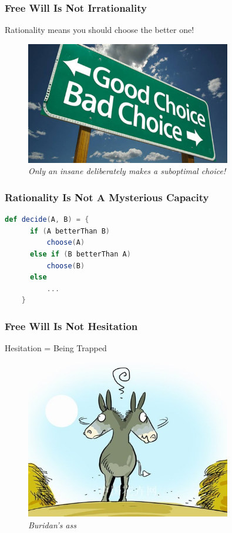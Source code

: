 \documentclass[xcolor=dvipsnames]{beamer}
\theoremstyle{definition}
\begin{document}
\begin{frame}[fragile]
  \frametitle{Free Will Is Not Irrationality}
  Rationality means you should choose the better one!

  \begin{figure}
    \centering
    \includegraphics[width=0.8\textwidth]{images/rationality.jpg}\\
    \emph{Only an insane deliberately makes a suboptimal choice!}
  \end{figure}
\end{frame}

\begin{frame}[fragile]
  \frametitle{Rationality Is Not A Mysterious Capacity}

  \begin{lstlisting}[language=Scala]
    def decide(A, B) = {
      if (A betterThan B)
          choose(A)
      else if (B betterThan A)
          choose(B)
      else
          ...
    }
  \end{lstlisting}
\end{frame}

\begin{frame}[fragile]
  \frametitle{Free Will Is Not Hesitation}

  \begin{center}
    \alert{\Large{Hesitation = Being Trapped}}\\[0.1cm]
  \end{center}

  \begin{figure}
    \centering
    \includegraphics[width=0.8\textwidth]{images/ass.jpg}\\
    \emph{Buridan's ass}
  \end{figure}
\end{frame}
\end{document}
